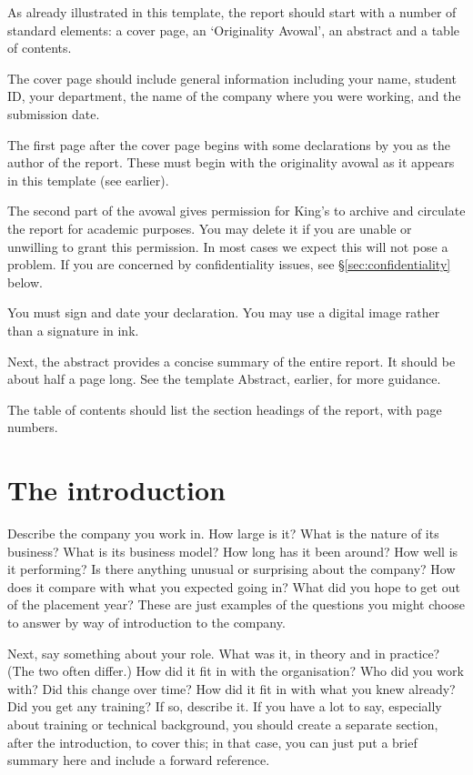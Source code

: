 \documentclass[british,12pt,a4paper]{report}
\begin{document}
As already illustrated in this template, the report should start with a number of standard elements:
a cover page, an `Originality Avowal', an abstract and a table of contents.

The cover page should include general information including your name, student ID, your department,
the name of the company where you were working, and the submission date.

The first page after the cover page begins with some declarations by you as the author of the
report. These must begin with the originality avowal as it appears in this template (see earlier).

The second part of the avowal gives permission for King's to archive and circulate the report for
academic purposes.
You may delete it if you are unable or unwilling to grant this permission.
In most cases we expect this will not pose a problem.
If you are concerned by confidentiality issues, see \S\ref{sec:confidentiality} below.

You must sign and date your declaration. You may use a digital image rather than a signature in ink.

Next, the abstract provides a concise summary of the entire report.
It should be about half a page long. See the template Abstract, earlier, for more guidance.

The table of contents should list the section headings of the report, with page numbers.

\section{The introduction}

Describe the company you work in.
How large is it?
What is the nature of its business?
What is its business model?
How long has it been around?
How well is it performing?
Is there anything unusual or surprising about the company?
How does it compare with what you expected going in?
What did you hope to get out of the placement year?
These are just examples of the questions you might choose to answer by way of introduction
to the company.

Next, say something about your role.
What was it, in theory and in practice? (The two often differ.)
How did it fit in with the organisation?
Who did you work with? Did this change over time?
How did it fit in with what you knew already?
Did you get any training?
If so, describe it.
If you have a lot to say, especially about training or technical background,
you should create a separate section, after the introduction, to cover this;
in that case, you can just put a brief summary here and include a forward reference.
\end{document}
